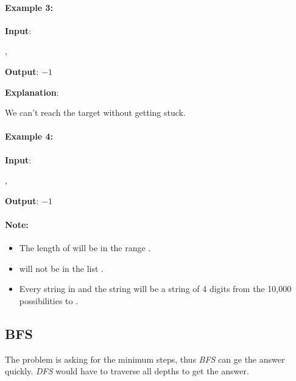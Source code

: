 \paragraph{Example 3:}

\begin{flushleft}
\textbf{Input}: 

, 

\textbf{Output}: $-1$

\textbf{Explanation}:

We can't reach the target without getting stuck.
\end{flushleft}

\paragraph{Example 4:}

\begin{flushleft}
\textbf{Input}: 

, 

\textbf{Output}: $-1$

\end{flushleft}

\paragraph{Note:}

\begin{itemize}
\item The length of  will be in the range \fcj{[1, 500]}.
\item {} will not be in the list .
\item Every string in  and the string  will be a string of 4 digits from the 10,000 possibilities  to .

\end{itemize}

\subsection{BFS}
The problem is asking for the minimum steps, thus \textit{BFS} can ge the answer quickly. \textit{DFS} would have to traverse all depths to get the answer.

